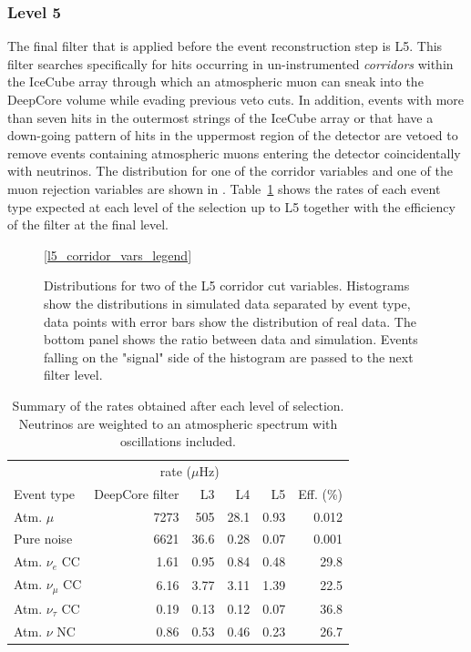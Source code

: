 \subsubsection{Level 5}
The final filter that is applied before the event reconstruction step is L5. This filter searches specifically for hits occurring in un-instrumented \emph{corridors} within the IceCube array through which an atmospheric muon can sneak into the DeepCore volume while evading previous veto cuts. In addition, events with more than seven hits in the outermost strings of the IceCube array or that have a down-going pattern of hits in the uppermost region of the detector are vetoed to remove events containing atmospheric muons entering the detector coincidentally with neutrinos. The distribution for one of the corridor variables and one of the muon rejection variables are shown in . Table~\ref{tab:l5_summary} shows the rates of each event type expected at each level of the selection up to L5 together with the efficiency of the filter at the final level.
\begin{figure}
    \centering
    \ref{l5_corridor_vars_legend}
    
    
    \caption{Distributions for two of the L5 corridor cut variables. Histograms show the distributions in simulated data separated by event type, data points with error bars show the distribution of real data. The bottom panel shows the ratio between data and simulation. Events falling on the "signal" side of the histogram are passed to the next filter level.}
    \label{fig:l5-vars}
\end{figure}

\begin{table}
\caption{Summary of the rates obtained after each level of selection. Neutrinos are weighted to an atmospheric spectrum with oscillations included.}
\label{tab:l5_summary}
\begin{tabular}{lrrrrr}\toprule
& \multicolumn{4}{c}{rate ($\mu$Hz)} & \\ \cmidrule{2-5}
Event type  & DeepCore filter   & L3   & L4   & L5   & Eff. (\%) \\
\toprule
Atm. $\mu$         & 7273 & 505  & 28.1 & 0.93 & 0.012          \\
Pure noise         & 6621 & 36.6 & 0.28 & 0.07 & 0.001          \\
Atm. $\nu_e$ CC    & 1.61 & 0.95 & 0.84 & 0.48 & 29.8           \\
Atm. $\nu_\mu$ CC  & 6.16 & 3.77 & 3.11 & 1.39 & 22.5           \\
Atm. $\nu_\tau$ CC & 0.19 & 0.13 & 0.12 & 0.07 & 36.8           \\
Atm. $\nu$ NC      & 0.86 & 0.53 & 0.46 & 0.23 & 26.7  \\
\bottomrule
\end{tabular}
\end{table}

